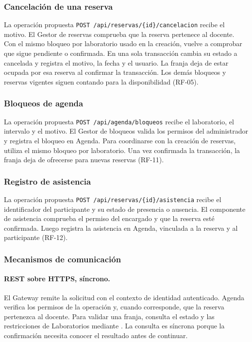 \subsubsection{Cancelación de una reserva}

La operación propuesta \texttt{POST /api/reservas/\{id\}/cancelacion} recibe
el motivo. El Gestor de reservas comprueba que la reserva pertenece al docente.
Con el mismo bloqueo por laboratorio usado en la creación, vuelve a comprobar
que sigue pendiente o confirmada. En una sola transacción cambia su estado a
cancelada y registra el motivo, la fecha y el usuario. La franja deja de estar
ocupada por esa reserva al confirmar la transacción. Los demás bloqueos y
reservas vigentes siguen contando para la disponibilidad (RF-05).

\subsubsection{Bloqueos de agenda}

La operación propuesta \texttt{POST /api/agenda/bloqueos} recibe el
laboratorio, el intervalo y el motivo. El Gestor de bloqueos valida los
permisos del administrador y registra el bloqueo en Agenda. Para coordinarse
con la creación de reservas, utiliza el mismo bloqueo por laboratorio.
Una vez confirmada la transacción, la franja deja de ofrecerse para nuevas
reservas (RF-11).

\subsubsection{Registro de asistencia}

La operación propuesta \texttt{POST /api/reservas/\{id\}/asistencia}
recibe el identificador del participante y su estado de presencia o
ausencia. El componente de asistencia comprueba el permiso del encargado
y que la reserva esté confirmada. Luego registra la asistencia en Agenda,
vinculada a la reserva y al participante (RF-12).

\subsubsection{Mecanismos de comunicación}
\paragraph{REST sobre HTTPS, síncrono.}
El Gateway remite la solicitud con el contexto de identidad autenticado.
Agenda verifica los permisos de la operación y, cuando corresponde, que la
reserva pertenezca al docente. Para validar una franja, consulta el estado
y las restricciones de Laboratorios mediante
. La consulta es síncrona
porque la confirmación necesita conocer el resultado antes de continuar.

